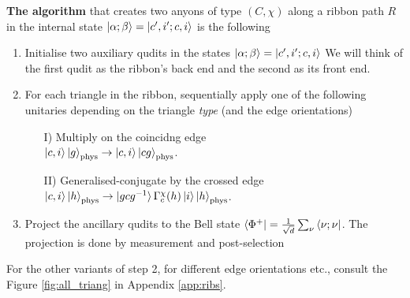 \documentclass[two column]{article}
\begin{document}



\textbf{The algorithm} that creates two anyons of type $(C,\chi)$ along a ribbon path $R$ in the internal state $\ket{\alpha; \beta} = \ket{c', i'; c, i}$ is the following
\begin{enumerate}
    \item Initialise two auxiliary qudits in the states $\ket{\alpha; \beta} = \ket{c', i'; c, i}$  We will think of the first qudit as the ribbon's back end and the second as its front end.
    \item For each triangle in the ribbon, sequentially apply one of the following unitaries depending on the triangle \textit{type} (and the edge orientations) 
    \begin{itemize}
        \item[I)] Multiply on the coincidng edge\\  $\ket{c, i}\ket{g}_\text{phys} \rightarrow \ket{c, i}\ket{cg}_\text{phys}$.
       \item[II)] Generalised-conjugate by the crossed edge\\ $\ket{c,i}\ket{h}_\text{phys} \rightarrow \ket{gcg^{-1}} \Gamma^\chi_c(h) \ket{i} \ket{h}_\text{phys}$.
    \end{itemize}
    \item Project the ancillary qudits to the Bell state $\bra{\Phi^+} = \frac{1}{\sqrt{d}}\sum_\nu \bra{\nu; \nu}$. The projection is done by measurement and post-selection
\end{enumerate}
For the other variants of step 2, for different edge orientations etc., consult the Figure \ref{fig:all_triang} in Appendix \ref{app:ribs}. 
\end{document}
